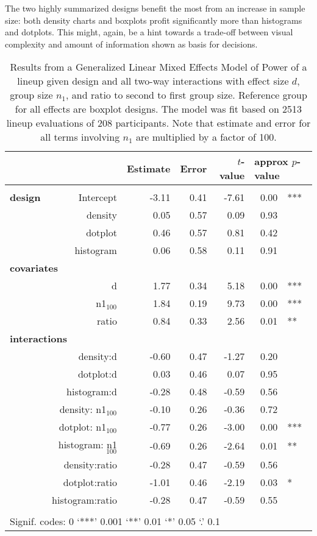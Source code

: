 The two highly summarized designs benefit the most from an increase in sample size: both density charts and boxplots profit significantly more than histograms and dotplots. This might, again, be a hint towards a trade-off between visual complexity and amount of information shown as basis for decisions. 
\begin{table}[ht]
\begin{center}
\resizebox{\linewidth}{!} {
\begin{tabular}{lrrrrrl}
  \hline
& & Estimate & Error & $t$-value & \multicolumn{2}{l}{approx $p$-value} \\   \hline
\\[-8pt]
\bf design& Intercept & -3.11 & 0.41 & -7.61 & 0.00 & ***\\ 
&  density & 0.05 & 0.57 & 0.09 & 0.93 \\ 
 & dotplot & 0.46 & 0.57 & 0.81 & 0.42 \\ 
  &histogram & 0.06 & 0.58 & 0.11 & 0.91 \\ [2pt]
\multicolumn{2}{l}{\bf covariates}\\
&  d & 1.77 & 0.34 & 5.18 & 0.00 & ***\\ [1pt]
&   n1$_{100}$ & 1.84 & 0.19 & 9.73 & 0.00 & *** \\ [1pt]
&  ratio & 0.84 & 0.33 & 2.56 & 0.01 & ** \\ [2pt]
\multicolumn{2}{l}{\bf interactions}\\
&    density:d & -0.60 & 0.47 & -1.27 & 0.20 \\ 
&    dotplot:d & 0.03 & 0.46 & 0.07 & 0.95 \\ 
&    histogram:d & -0.28 & 0.48 & -0.59 & 0.56 \\ [1pt]
&    density: n1$_{100}$ & -0.10 & 0.26 & -0.36 & 0.72 \\ 
&    dotplot: n1$_{100}$ & -0.77 & 0.26 & -3.00 & 0.00 & *** \\ 
&    histogram: n1$_{100}$ & -0.69 & 0.26 & -2.64 & 0.01 & ** \\ [1pt]
&    density:ratio & -0.28 & 0.47 & -0.59 & 0.56 \\ 
&    dotplot:ratio & -1.01 & 0.46 & -2.19 & 0.03 & * \\ 
&histogram:ratio & -0.28 & 0.47 & -0.59 & 0.55 \\ 
   \hline
\\[-5pt]
   \multicolumn{5}{l}{Signif. codes:  0 `***' 0.001 `**' 0.01 `*' 0.05 `.' 0.1}
\end{tabular}}
\end{center}
\caption{Results from a Generalized Linear Mixed Effects Model of Power of a lineup given design and all two-way interactions with effect size $d$, group size $n_1$, and ratio to second to first group size. Reference group for all effects are boxplot designs. The model was fit based on 2513 lineup evaluations of 208 participants. Note that estimate and error for all terms involving $n_1$ are multiplied by a factor of 100.}
\label{tbl:power2}
\end{table}

